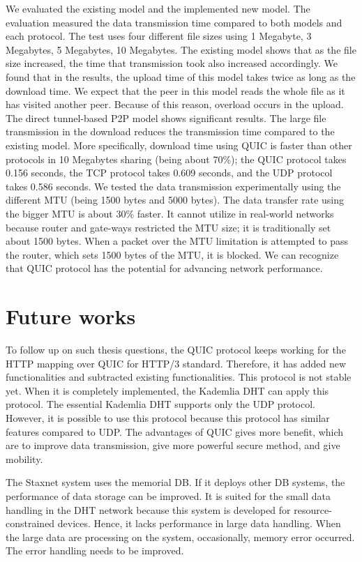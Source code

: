 We evaluated the existing model and the implemented new model. The evaluation measured the data transmission time compared to both models and each protocol. The test uses four different file sizes using 1 Megabyte, 3 Megabytes, 5 Megabytes, 10 Megabytes. The existing model shows that as the file size increased, the time that transmission took also increased accordingly. We found that in the results, the upload time of this model takes twice as long as the download time. We expect that the peer in this model reads the whole file as it has visited another peer. Because of this reason, overload occurs in the upload. The direct tunnel-based P2P model shows significant results. The large file transmission in the download reduces the transmission time compared to the existing model. More specifically, download time using QUIC is faster than other protocols in 10 Megabytes sharing (being about 70\%); the QUIC protocol takes 0.156 seconds, the TCP protocol takes 0.609 seconds, and the UDP protocol takes 0.586 seconds. We tested the data transmission experimentally using the different MTU (being 1500 bytes and 5000 bytes). The data transfer rate using the bigger MTU is about 30\% faster. It cannot utilize in real-world networks because router and gate-ways restricted the MTU size; it is traditionally set about 1500 bytes. When a packet over the MTU limitation is attempted to pass the router, which sets 1500 bytes of the MTU, it is blocked. We can recognize that QUIC protocol has the potential for advancing network performance.

\section{Future works}

To follow up on such thesis questions, the QUIC protocol keeps working for the HTTP mapping over QUIC for HTTP/3 standard. Therefore, it has added new functionalities and subtracted existing functionalities. This protocol is not stable yet. When it is completely implemented, the Kademlia DHT can apply this protocol. The essential Kademlia DHT supports only the UDP protocol. However, it is possible to use this protocol because this protocol has similar features compared to UDP. The advantages of QUIC gives more benefit, which are to improve data transmission, give more powerful secure method, and give mobility. 

The Staxnet system uses the memorial DB. If it deploys other DB systems, the performance of data storage can be improved. It is suited for the small data handling in the DHT network because this system is developed for resource-constrained devices. Hence, it lacks performance in large data handling. When the large data are processing on the system, occasionally, memory error occurred. The error handling needs to be improved. 
